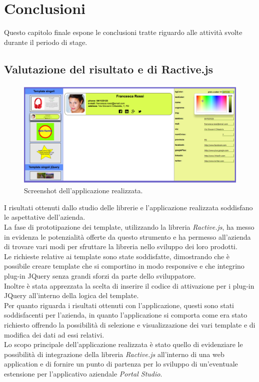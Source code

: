 
\chapter{Conclusioni}
\label{cap:conclusioni}

Questo capitolo finale espone le conclusioni tratte riguardo alle attività svolte durante il periodo di stage.

\section{Valutazione del risultato e di Ractive.js}
\begin{figure}[htp]
	\centering
	\includegraphics[scale=0.31]{../immagini/screenshot_app}
	\caption{Screenshot dell'applicazione realizzata.}
\end{figure}
I risultati ottenuti dallo studio delle librerie e l'applicazione realizzata soddisfano le aspettative dell'azienda.\\
La fase di prototipazione dei template, utilizzando la libreria \textit{Ractive.js}, ha messo in evidenza le potenzialità offerte da questo strumento e ha permesso all'azienda di trovare vari modi per sfruttare la libreria nello sviluppo dei loro prodotti.\\
Le richieste relative ai template sono state soddisfatte, dimostrando che è possibile creare template che si comportino in modo responsive e che integrino plug-in JQuery senza grandi sforzi da parte dello sviluppatore.\\
Inoltre è stata apprezzata la scelta di inserire il codice di attivazione per i plug-in JQuery all'interno della logica del template.\\
Per quanto riguarda i risultati ottenuti con l'applicazione, questi sono stati soddisfacenti per l'azienda, in quanto l'applicazione si comporta come era stato richiesto offrendo la possibilità di selezione e visualizzazione dei vari template e di modifica dei dati ad essi relativi.\\
Lo scopo principale dell'applicazione realizzata è stato quello di evidenziare le possibilità di integrazione della libreria \textit{Ractive.js} all'interno di una web application e di fornire un punto di partenza per lo sviluppo di un'eventuale estensione per l'applicativo aziendale \textit{Portal Studio}.
 

